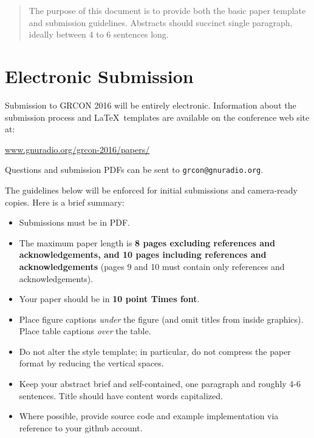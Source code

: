 \documentclass{article}
\begin{document}
 


\vskip 0.3in

\begin{abstract} 
The purpose of this document is to provide both the basic paper template and submission guidelines. 
Abstracts should succinct single paragraph, ideally between 4 to 6 sentences long.
\end{abstract} 

\section{Electronic Submission}
\label{submission}

Submission to GRCON 2016 will be entirely electronic.  
Information about the submission process and \LaTeX\ templates
are available on the conference web site at:

\begin{center}
\url{www.gnuradio.org/grcon-2016/papers/}
\end{center}

Questions and submission PDFs can be sent to 
\texttt{grcon@gnuradio.org}.

The guidelines below will be enforced for initial submissions and
camera-ready copies.  Here is a brief summary:
\begin{itemize}
\item Submissions must be in PDF.
\item The maximum paper length is \textbf{8 pages excluding references and acknowledgements, and 10 pages
  including references and acknowledgements} (pages 9 and 10 must contain only references and acknowledgements).

\item Your paper should be in \textbf{10 point Times font}.
\item Place figure captions {\em under} the figure (and omit titles from inside graphics).  Place table captions {\em over} the table.
\item Do not alter the style template; in particular, do not compress the paper format by reducing the vertical spaces.
\item Keep your abstract brief and self-contained, one paragraph and roughly 4-6 sentences.  Title should have content words capitalized.
\item Where possible, provide source code and example implementation via reference to your github account.
\end{itemize}
\end{document}
